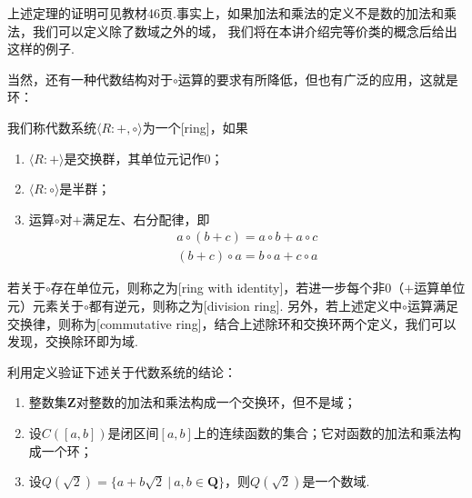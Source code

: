 上述定理的证明可见教材46页.事实上，如果加法和乘法的定义不是数的加法和乘法，我们可以定义除了数域之外的域，
我们将在本讲介绍完等价类的概念后给出这样的例子.

当然，还有一种代数结构对于$\circ$运算的要求有所降低，但也有广泛的应用，这就是环：
\begin{definition}
    我们称代数系统$\langle R:+,\circ\rangle$为一个[ring]，如果
    \begin{enumerate}
        \item $\langle R:+\rangle$是交换群，其单位元记作0；

        \item $\langle R:\circ\rangle$是半群；

        \item 运算$\circ$对$+$满足左、右分配律，即
        \begin{gather*}
            a\circ(b+c)=a\circ b+a\circ c \\
            (b+c)\circ a=b\circ a+c\circ a
        \end{gather*}
    \end{enumerate}

    若关于$\circ$存在单位元，则称之为[ring with identity]，若进一步每个非0（$+$运算单位元）元素关于$\circ$都有逆元，则称之为[division ring].
    另外，若上述定义中$\circ$运算满足交换律，则称为[commutative ring]，结合上述除环和交换环两个定义，我们可以发现，交换除环即为域.
\end{definition}

\begin{example}
    利用定义验证下述关于代数系统的结论：
    \begin{enumerate}[label=(\arabic*)]
        \item 整数集$\mathbf{Z}$对整数的加法和乘法构成一个交换环，但不是域；

        \item 设$C([a,b])$是闭区间$[a,b]$上的连续函数的集合；它对函数的加法和乘法构成一个环；

        \item 设$Q(\sqrt{2})=\{a+b\sqrt{2}\ |\ a,b\in\mathbf{Q}\}$，则$Q(\sqrt{2})$是一个数域.
    \end{enumerate}
\end{example}


